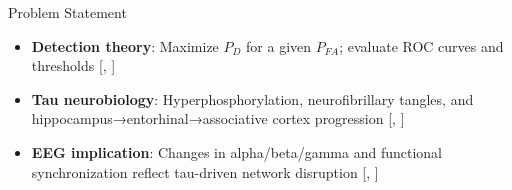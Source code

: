 \documentclass{beamer}
\renewcommand{\parencite}[1]{[\citeauthor{#1}, \citeyear{#1}]}
\renewcommand{\cite}[1]{\parencite{#1}}
\begin{document}
\begin{frame}{Problem Statement}
\begin{itemize}
  \item \textbf{Detection theory}: Maximize \(P_{D}\) for a given \(P_{FA}\); evaluate ROC curves and thresholds {\tiny\cite{Kay1998}}
  \item \textbf{Tau neurobiology}: Hyperphosphorylation, neurofibrillary tangles, and hippocampus→entorhinal→associative cortex progression {\tiny\cite{Tolnay1999}}
  \item \textbf{EEG implication}: Changes in alpha/beta/gamma and functional synchronization reflect tau-driven network disruption {\tiny\cite{dePaula2009}}
\end{itemize}
\end{frame}

\end{document}
